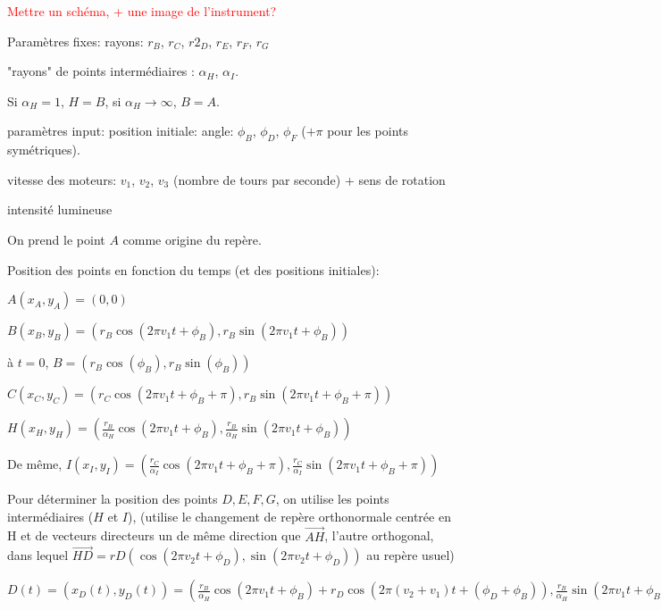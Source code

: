 \documentclass[11pt,a4paper]{article}
\newcommand{\FL}[1]{\textcolor{red}{#1}}
\begin{document}
\FL{Mettre un schéma, + une image de l'instrument?}

Paramètres fixes: 
rayons: $r_B$, $r_C$, $r2_D$, $r_E$, $r_F$, $r_G$
 
"rayons" de points intermédiaires : $\alpha_H$, $\alpha_I$. 

Si $\alpha_H=1$, $H=B$, si $\alpha_H \rightarrow \infty$, $B=A$.


paramètres input: 
position initiale: angle: $\phi_B$, $\phi_D$, $\phi_F$
($+ \pi$ pour les points symétriques).

vitesse des moteurs: $v_1$, $v_2$, $v_3$ (nombre de tours par seconde) + sens de rotation

intensité lumineuse


On prend le point $A$ comme origine du repère.

Position des points en fonction du temps (et des positions initiales):

$A(x_A,y_A) = (0,0)$

$B(x_B,y_B) = (r_B \cos(2 \pi v_1 t + \phi_B),r_B \sin(2 \pi v_1 t + \phi_B))$

à $t=0$, $B = (r_B \cos(\phi_B), r_B \sin(\phi_B))$

$C(x_C,y_C) = (r_C \cos(2 \pi v_1 t + \phi_B + \pi),r_B \sin(2 \pi v_1 t + \phi_B + \pi))$

$H(x_H,y_H) = ( \frac{r_B}{\alpha_H} \cos(2 \pi v_1 t + \phi_B),\frac{r_B}{\alpha_H} \sin(2 \pi v_1 t + \phi_B))$

De même,
$I(x_I,y_I) = ( \frac{r_C}{\alpha_I} \cos(2 \pi v_1 t + \phi_B + \pi), \frac{r_C}{\alpha_I} \sin(2 \pi v_1 t + \phi_B + \pi))$

Pour déterminer la position des points $D,E,F,G$, on utilise les points intermédiaires ($H$ et $I$), (utilise le changement de repère  orthonormale centrée en H et de vecteurs directeurs un  de même direction que $\overrightarrow{AH}$, l'autre orthogonal, dans lequel $\overrightarrow{HD} =  rD( \cos(2 \pi v_2 t + \phi_D), \sin(2 \pi v_2 t + \phi_D))$ au repère usuel)

$ D(t) = (x_D(t),y_D(t)) = (\frac{r_B}{\alpha_H} \cos(2 \pi v_1 t + \phi_B) + r_D \cos(2 \pi (v_2 + v _1)t + (\phi_D + \phi_B)), \frac{r_B}{\alpha_H} \sin(2 \pi v_1 t + \phi_B ) + r_D \sin(2 \pi (v_2 +v_1)t +  (\phi_D + \phi_B))  )$

%
%
%
\end{document}
